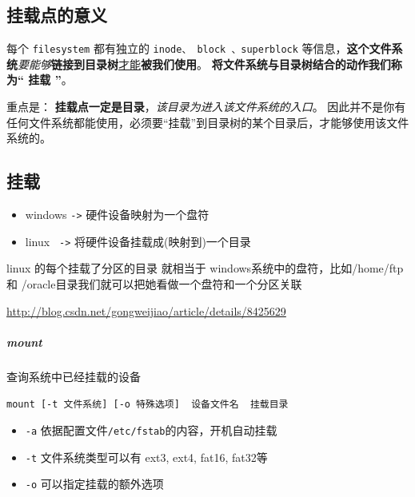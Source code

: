 \documentclass[UTF8,a4paper,12pt]{ctexbook}
\begin{document}
		\subsection{挂载点的意义}
			每个 \verb|filesystem| 都有独立的 \verb|inode、 block 、superblock| 等信息，\textbf{这个文件系统}\textit{要能够}\textbf{链接到目录树}\underline{才能}\textbf{被我们使用}。 \textbf{将文件系统与目录树结合的动作我们称为“ 挂载 ”}。 
			
			重点是： \textbf{挂载点一定是目录}，\textit{该目录为进入该文件系统的入口}。 因此并不是你有任何文件系统都能使用，必须要“挂载”到目录树的某个目录后，才能够使用该文件系统的。
			
		\subsection{挂载}
			\begin{itemize}
				\item windows \verb|->| 硬件设备映射为一个盘符
				\item linux \verb| ->| 将硬件设备挂载成(映射到)一个目录
			\end{itemize}

			linux 的每个挂载了分区的目录 就相当于 windows系统中的盘符，比如/home/ftp 和 /oracle目录我们就可以把她看做一个盘符和一个分区关联
			
			\url{http://blog.csdn.net/gongweijiao/article/details/8425629}
		\subparagraph{mount}查询系统中已经挂载的设备
		
			\verb|mount [-t 文件系统] [-o 特殊选项]  设备文件名  挂载目录|
			
			\begin{itemize}
				\item \verb|-a| 依据配置文件\verb|/etc/fstab|的内容，开机自动挂载
				\item \verb|-t| 文件系统类型可以有 ext3, ext4, fat16, fat32等
				\item \verb|-o| 可以指定挂载的额外选项
			\end{itemize}
		
\end{document}
